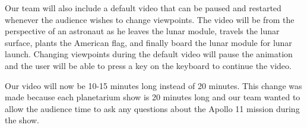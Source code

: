 \documentclass[onecolumn, draftclsnofoot,10pt, compsoc]{IEEEtran}
\begin{document}
Our team will also include a default video that can be paused and restarted whenever the audience wishes to change viewpoints. The video will be from the perspective of an astronaut as he leaves the lunar module, travels the lunar surface, plants the American flag, and finally board the lunar module for lunar launch. Changing viewpoints during the default video will pause the animation and the user will be able to press a key on the keyboard to continue the video.

Our video will now be 10-15 minutes long instead of 20 minutes. This change was made because each planetarium show is 20 minutes long and our team wanted to allow the audience time to ask any questions about the Apollo 11 mission during the show.
\end{document}
